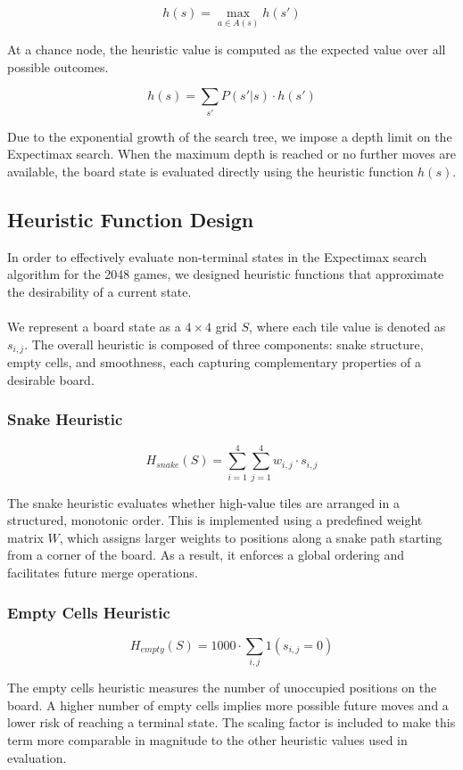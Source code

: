 \documentclass{article}
\begin{document}
$$h(s) = \max_{a \in A(s)} h(s')$$

At a chance node, the heuristic value is computed as the expected value over all possible outcomes.

$$h(s) = \sum_{s'} P(s'|s) \cdot h(s')$$

Due to the exponential growth of the search tree, we impose a depth limit on the Expectimax search.
When the maximum depth is reached or no further moves are available, the board state is evaluated directly
using the heuristic function $h(s)$.

\subsection{Heuristic Function Design}

In order to effectively evaluate non-terminal states in the Expectimax search algorithm for the 2048 games,
we designed heuristic functions that approximate the desirability of a current state. 
\\
\\
We represent a board state as a $4 \times 4$ grid $S$, where each tile value is denoted as $s_{i,j}$.
The overall heuristic is composed of three components: snake structure, empty cells, and smoothness, each capturing
complementary properties of a desirable board.

\subsubsection{Snake Heuristic}

$$H_{snake}(S) = \sum_{i=1}^{4} \sum_{j=1}^{4} w_{i,j} \cdot s_{i,j}$$

The snake heuristic evaluates whether high-value tiles are arranged in a structured, monotonic order.
This is implemented using a predefined weight matrix $W$, which assigns larger weights to positions along a snake
path starting from a corner of the board. As a result, it enforces a global ordering and facilitates future merge
operations.

\subsubsection{Empty Cells Heuristic}

$$H_{empty}(S) = 1000 \cdot \sum_{i, j} 1(s_{i,j} = 0)$$

The empty cells heuristic measures the number of unoccupied positions on the board. A higher number of empty cells
implies more possible future moves and a lower risk of reaching a terminal state. The scaling factor is included to
make this term more comparable in magnitude to the other heuristic values used in evaluation.
\end{document}
